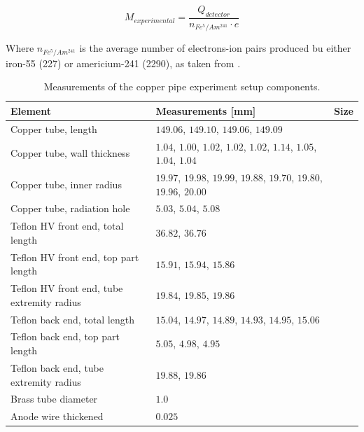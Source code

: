 \begin{equation}
  M_{experimental} = \frac{Q_{detector}}{n_{Fe^{5}/Am^{241}}\cdot e}
\end{equation}

Where $n_{Fe^{5}/Am^{241}}$ is the average number of electrons-ion pairs produced bu either iron-55 (227) or americium-241 (2290), as taken from \cite{can_paper}.




\begin{table}[]
	\begin{tabularx}{\linewidth}{X|X|p{2cm}}
		\textbf{Element} & \textbf{Measurements} {[}mm{]}                                                  & \textbf{Size} \\ \hline
		Copper tube, length                        & $149.06$, $149.10$, $149.06$, $149.09$                                 &      \\
		Copper tube, wall thickness                & $1.04$, $1.00$, $1.02$, $1.02$, $1.02$, $1.14$, $1.05$, $1.04$, $1.04$ &      \\
		Copper tube, inner radius                  & $19.97$, $19.98$, $19.99$, $19.88$, $19.70$, $19.80$, $19.96$, $20.00$ &      \\
		Copper tube, radiation hole                & $5.03$, $5.04$, $5.08$                                                 &      \\
		Teflon HV front end,  total length         & $36.82$, $36.76$                                                       &      \\
		Teflon HV front end, top part length       & $15.91$, $15.94$, $15.86$                                              &      \\
		Teflon HV front end, tube extremity radius & $19.84$, $19.85$, $19.86$                                              &      \\
		Teflon back end, total length              & $15.04$, $14.97$, $14.89$, $14.93$, $14.95$, $15.06$                   &      \\
		Teflon back end, top part length           & $5.05$, $4.98$, $4.95$                                                 &      \\
		Teflon back end, tube extremity radius     & $19.88$, $19.86$                                                       &      \\
		Brass tube diameter                        & $1.0$                                                                  &      \\
		Anode wire thickened                       & $0.025$                                                                &     
	\end{tabularx}
\caption{Measurements of the copper pipe experiment setup components.}
\label{Tab:coppercan_sizes}
\end{table}
